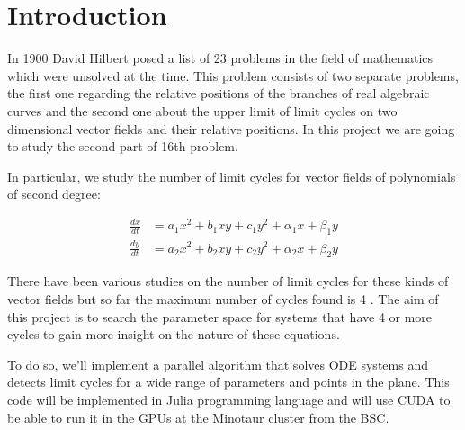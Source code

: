 
\section{Introduction}%
\label{sec:intro}

In 1900 David Hilbert posed a list of 23 problems in the field of mathematics
which were unsolved at the time.  This problem consists of two separate
problems, the first one regarding the relative positions of the branches of real
algebraic curves and the second one about the upper limit of limit cycles on two
dimensional vector fields and their relative positions. In this project we are
going to study the second part of 16th problem.

In particular, we study the number of limit cycles for vector fields of
polynomials of second degree:

\begin{align}
    \frac{dx}{dt} &= a_1x^2 + b_1xy + c_1y^2 + \alpha_1x + \beta_1y \\
    \frac{dy}{dt} &= a_2x^2 + b_2xy + c_2y^2 + \alpha_2x + \beta_2y
\end{align}

There have been various studies on the number of limit cycles for these kinds of
vector fields but so far the maximum number of cycles found is 4 \cite{kuznetsov_visualization_2013}. The aim of
this project is to search the parameter space for systems that have 4 or more
cycles to gain more insight on the nature of these equations.

To do so, we'll implement a parallel algorithm that solves ODE systems and
detects limit cycles for a wide range of parameters and points in the plane.
This code will be implemented in Julia programming language and will use CUDA
to be able to run it in the GPUs at the Minotaur cluster from the BSC.
